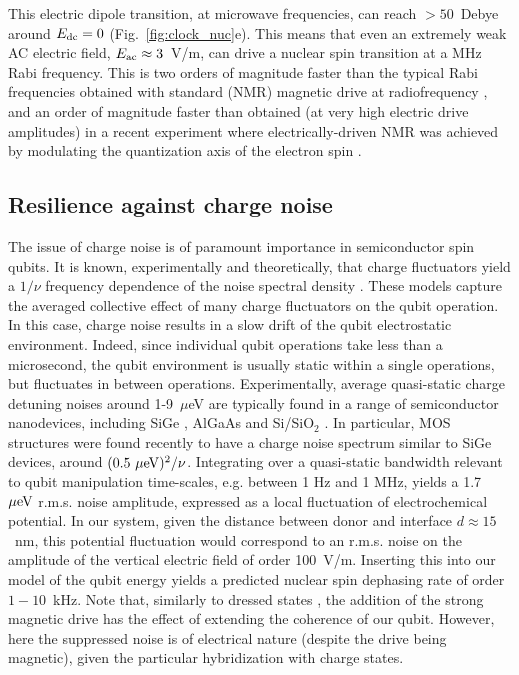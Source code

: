 \documentclass[
 aps,prb,twocolumn,
 amsmath,amssymb,superscriptaddress,
] {revtex4-1}
\begin{document}
This electric dipole transition, at microwave frequencies, can reach $>50$~Debye around $E_{\rm dc}=0$ (Fig.~\ref{fig:clock_nuc}e). This means that even an extremely weak AC electric field, $E_{\rm ac}\approx 3$~V/m, can drive a nuclear spin transition at a MHz Rabi frequency. This is two orders of magnitude faster than the typical Rabi frequencies obtained with standard (NMR) magnetic drive at radiofrequency \cite{Pla2013}, and an order of magnitude faster than obtained (at very high electric drive amplitudes) in a recent experiment where electrically-driven NMR was achieved by modulating the quantization axis of the electron spin \cite{Sigillito2017}.

\subsection{Resilience against charge noise}

The issue of charge noise is of paramount importance in semiconductor spin qubits. It is known, experimentally and theoretically, that charge fluctuators yield a $1/\nu$ frequency dependence of the noise spectral density \cite{Paladino2013}. These models capture the averaged collective effect of many charge fluctuators on the qubit operation. In this case, charge noise results in a slow drift of the qubit electrostatic environment. Indeed, since individual qubit operations take less than a microsecond, the qubit environment is usually static within a single operations, but fluctuates in between operations. Experimentally, average quasi-static charge detuning noises around 1-9~$\mu$eV are typically found in a range of semiconductor nanodevices, including SiGe \cite{Kim2015,Thorgrimsson2016,Freeman2016}, AlGaAs \cite{Dial2013} and Si/SiO$_2$ \cite{Harvey-Collard2017,Freeman2016}. In particular, MOS structures were found recently \cite{Freeman2016} to have a charge noise spectrum similar to SiGe devices, around $(0.5~{\rm \mu eV})^2/\nu$. Integrating over a quasi-static bandwidth relevant to qubit manipulation time-scales, e.g. between 1 Hz and 1 MHz, yields a 1.7~${\rm \mu eV}$ r.m.s. noise amplitude, expressed as a local fluctuation of electrochemical potential. In our system, given the distance between donor and interface $d \approx 15$~nm, this potential fluctuation would correspond to an r.m.s. noise on the amplitude of the vertical electric field of order 100~V/m. Inserting this into our model of the qubit energy yields a predicted nuclear spin dephasing rate of order $1-10$~kHz. Note that, similarly to dressed states \cite{London2013,Laucht2016,Laucht2017}, the addition of the strong magnetic drive has the effect of extending the coherence of our qubit. However, here the suppressed noise is of electrical nature (despite the drive being magnetic), given the particular hybridization with charge states.
\end{document}
